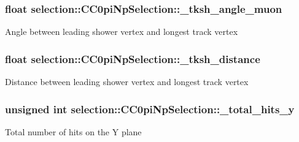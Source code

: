 \subsubsection[{\texorpdfstring{\+\_\+tksh\+\_\+angle\+\_\+muon}{_tksh_angle_muon}}]{\setlength{\rightskip}{0pt plus 5cm}float selection\+::\+C\+C0pi\+Np\+Selection\+::\+\_\+tksh\+\_\+angle\+\_\+muon\hspace{0.3cm}{\ttfamily [private]}}\hypertarget{classselection_1_1CC0piNpSelection_a8210028b7144d3dc078201257a1a8663}{}\label{classselection_1_1CC0piNpSelection_a8210028b7144d3dc078201257a1a8663}
Angle between leading shower vertex and longest track vertex 
\subsubsection[{\texorpdfstring{\+\_\+tksh\+\_\+distance}{_tksh_distance}}]{\setlength{\rightskip}{0pt plus 5cm}float selection\+::\+C\+C0pi\+Np\+Selection\+::\+\_\+tksh\+\_\+distance\hspace{0.3cm}{\ttfamily [private]}}\hypertarget{classselection_1_1CC0piNpSelection_a73d772bb569336b56a3f14cee752e2f3}{}\label{classselection_1_1CC0piNpSelection_a73d772bb569336b56a3f14cee752e2f3}
Distance between leading shower vertex and longest track vertex 
\subsubsection[{\texorpdfstring{\+\_\+total\+\_\+hits\+\_\+y}{_total_hits_y}}]{\setlength{\rightskip}{0pt plus 5cm}unsigned int selection\+::\+C\+C0pi\+Np\+Selection\+::\+\_\+total\+\_\+hits\+\_\+y\hspace{0.3cm}{\ttfamily [private]}}\hypertarget{classselection_1_1CC0piNpSelection_a819d1d973e74bcd2ad82aa01ea24ac37}{}\label{classselection_1_1CC0piNpSelection_a819d1d973e74bcd2ad82aa01ea24ac37}
Total number of hits on the Y plane 
